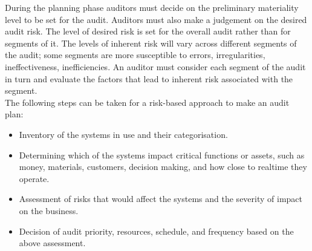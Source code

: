 \documentclass[12pt]{article}
\begin{document}
\newpage
During the planning phase auditors must decide on the preliminary materiality level to be set for the audit. Auditors must also make a judgement on the desired audit risk. The level of desired risk is set for the overall audit rather than for segments of it. The levels of inherent risk will vary across different segments of the audit; some segments are more susceptible to errors, irregularities, ineffectiveness, inefficiencies. An auditor must consider each segment of the audit in turn and evaluate the factors that lead to inherent risk associated with the segment.\\ The following steps can be taken for a risk-based approach to make an audit plan:
\begin{itemize}
    \item Inventory of the systems in use and their categorisation.
    \item Determining which of the systems impact critical functions or assets, such as money, materials, customers, decision making, and how close to realtime they operate.
    \item Assessment of risks that would affect the systems and the severity of impact on the business.
    \item Decision of audit priority, resources, schedule, and frequency based on the above assessment.
\end{itemize}
\end{document}
